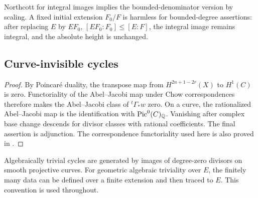 
Northcott for integral images implies the bounded-denominator version
by scaling. A fixed initial extension \(F_0/F\) is harmless for
bounded-degree assertions: after replacing \(E\) by \(EF_0\),
\([EF_0:F_0]\le[E:F]\), the integral image remains integral, and
the absolute height is unchanged.

\subsection{Curve-invisible cycles}\label{sec:invisible-cycles}


\begin{proof}
By Poincaré duality, the transpose map from
\(H^{2n+1-2r}(X)\) to \(H^1(C)\) is zero. Functoriality of the
Abel--Jacobi map under Chow correspondences therefore makes the
Abel--Jacobi class of \({}^t\Gamma_*w\) zero. On a curve, the
rationalized Abel--Jacobi map is the identification with
\(\operatorname{Pic}^0(C)_\mathbb Q\). Vanishing after complex base change descends for
divisor classes with rational coefficients. The final assertion is
adjunction. The correspondence functoriality used here is also
proved in \cite[Lemma~4.11]{LagaShnidman}.
\end{proof}

Algebraically trivial cycles are generated by images of degree-zero
divisors on smooth projective curves. For geometric algebraic
triviality over \(E\), the finitely many data can be defined over a
finite extension and then traced to \(E\). This convention is used
throughout.

